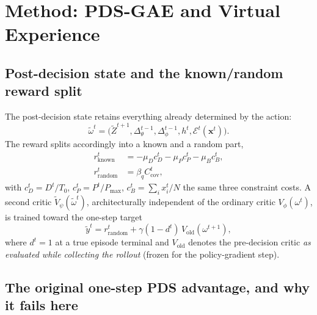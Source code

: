 \documentclass[conference]{IEEEtran}
\newcommand{\mbf}[1]{\mathbf{#1}}
\begin{document}
\section{Method: PDS-GAE and Virtual Experience}
\label{sec:method}

\subsection{Post-decision state and the known/random reward split}

The post-decision state retains everything already determined by the action:
\begin{equation}
\tilde\omega^t = \big(\tilde Z^{t+1}, \Delta_\theta^{t-1}, \Delta_\phi^{t-1}, h^t, \mathcal{E}^t(\mbf{x}^t)\big).
\end{equation}
The reward splits accordingly into a known and a random part,
\begin{align}
r^t_{\text{known}} &= -\mu_D c_D^t - \mu_P c_P^t - \mu_B c_B^t, \label{eq:rknown}\\
r^t_{\text{random}} &= \beta_q C_{\text{cov}}^t, \label{eq:rrandom}
\end{align}
with $c_D^t = D^t/T_0$, $c_P^t = P^t/P_{\max}$, $c_B^t = \sum_i x_i^t / N$ the same three
constraint costs. A second critic $\tilde V_\psi(\tilde\omega^t)$, architecturally
independent of the ordinary critic $V_\phi(\omega^t)$, is trained toward the one-step
target
\begin{equation}
\tilde y^t = r^t_{\text{random}} + \gamma(1-d^t)\, V_{\text{old}}(\omega^{t+1}), \label{eq:ytilde}
\end{equation}
where $d^t{=}1$ at a true episode terminal and $V_{\text{old}}$ denotes the
pre-decision critic \emph{as evaluated while collecting the rollout} (frozen for the
policy-gradient step).

\subsection{The original one-step PDS advantage, and why it fails here}
\end{document}
